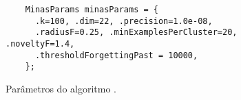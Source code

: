 
\begin{figure}[htb]
  \centering
  \begin{lstlisting}
    MinasParams minasParams = {
      .k=100, .dim=22, .precision=1.0e-08,
      .radiusF=0.25, .minExamplesPerCluster=20, .noveltyF=1.4,
      .thresholdForgettingPast = 10000,
    };
  \end{lstlisting}
  \caption{Parâmetros do algoritmo \minas.}
  \label{fig:params}
\end{figure}








